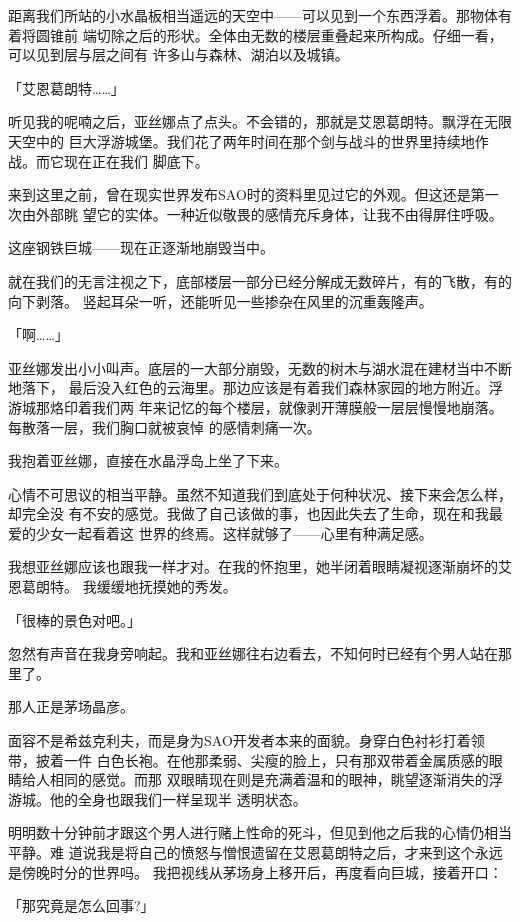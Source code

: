 \documentclass[11pt]{book}
\begin{document}
距离我们所站的小水晶板相当遥远的天空中——可以见到一个东西浮着。那物体有着将圆锥前
端切除之后的形状。全体由无数的楼层重叠起来所构成。仔细一看，可以见到层与层之间有
许多山与森林、湖泊以及城镇。

「艾恩葛朗特……」

听见我的呢喃之后，亚丝娜点了点头。不会错的，那就是艾恩葛朗特。飘浮在无限天空中的
巨大浮游城堡。我们花了两年时间在那个剑与战斗的世界里持续地作战。而它现在正在我们
脚底下。

来到这里之前，曾在现实世界发布SAO时的资料里见过它的外观。但这还是第一次由外部眺
望它的实体。一种近似敬畏的感情充斥身体，让我不由得屏住呼吸。

这座钢铁巨城——现在正逐渐地崩毁当中。

就在我们的无言注视之下，底部楼层一部分已经分解成无数碎片，有的飞散，有的向下剥落。
竖起耳朵一听，还能听见一些掺杂在风里的沉重轰隆声。

「啊……」

亚丝娜发出小小叫声。底层的一大部分崩毁，无数的树木与湖水混在建材当中不断地落下，
最后没入红色的云海里。那边应该是有着我们森林家园的地方附近。浮游城那烙印着我们两
年来记忆的每个楼层，就像剥开薄膜般一层层慢慢地崩落。每散落一层，我们胸口就被哀悼
的感情刺痛一次。

我抱着亚丝娜，直接在水晶浮岛上坐了下来。

心情不可思议的相当平静。虽然不知道我们到底处于何种状况、接下来会怎么样，却完全没
有不安的感觉。我做了自己该做的事，也因此失去了生命，现在和我最爱的少女一起看着这
世界的终焉。这样就够了——心里有种满足感。

我想亚丝娜应该也跟我一样才对。在我的怀抱里，她半闭着眼睛凝视逐渐崩坏的艾恩葛朗特。
我缓缓地抚摸她的秀发。

「很棒的景色对吧。」

忽然有声音在我身旁响起。我和亚丝娜往右边看去，不知何时已经有个男人站在那里了。

那人正是茅场晶彦。

面容不是希兹克利夫，而是身为SAO开发者本来的面貌。身穿白色衬衫打着领带，披着一件
白色长袍。在他那柔弱、尖瘦的脸上，只有那双带着金属质感的眼睛给人相同的感觉。而那
双眼睛现在则是充满着温和的眼神，眺望逐渐消失的浮游城。他的全身也跟我们一样呈现半
透明状态。

明明数十分钟前才跟这个男人进行赌上性命的死斗，但见到他之后我的心情仍相当平静。难
道说我是将自己的愤怒与憎恨遗留在艾恩葛朗特之后，才来到这个永远是傍晚时分的世界吗。
我把视线从茅场身上移开后，再度看向巨城，接着开口：

「那究竟是怎么回事?」
\end{document}
